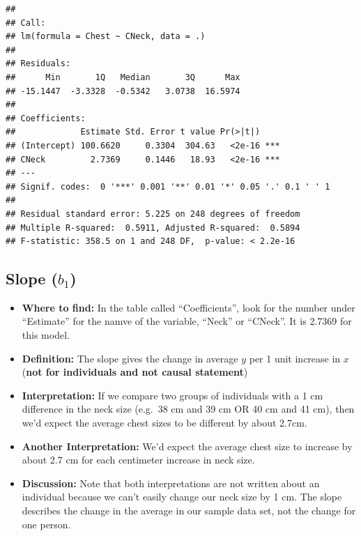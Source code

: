 \documentclass[]{book}
\newenvironment{Shaded}{\begin{snugshade}}{\end{snugshade}}
\newcommand{\DataTypeTok}[1]{\textcolor[rgb]{0.13,0.29,0.53}{#1}}
\newcommand{\KeywordTok}[1]{\textcolor[rgb]{0.13,0.29,0.53}{\textbf{#1}}}
\newcommand{\NormalTok}[1]{#1}
\newcommand{\OperatorTok}[1]{\textcolor[rgb]{0.81,0.36,0.00}{\textbf{#1}}}
\newcommand{\StringTok}[1]{\textcolor[rgb]{0.31,0.60,0.02}{#1}}
\providecommand{\tightlist}{%
  \setlength{\itemsep}{0pt}\setlength{\parskip}{0pt}}
\begin{document}
\begin{Shaded}
\end{Shaded}

\begin{verbatim}
## 
## Call:
## lm(formula = Chest ~ CNeck, data = .)
## 
## Residuals:
##      Min       1Q   Median       3Q      Max 
## -15.1447  -3.3328  -0.5342   3.0738  16.5974 
## 
## Coefficients:
##             Estimate Std. Error t value Pr(>|t|)    
## (Intercept) 100.6620     0.3304  304.63   <2e-16 ***
## CNeck         2.7369     0.1446   18.93   <2e-16 ***
## ---
## Signif. codes:  0 '***' 0.001 '**' 0.01 '*' 0.05 '.' 0.1 ' ' 1
## 
## Residual standard error: 5.225 on 248 degrees of freedom
## Multiple R-squared:  0.5911, Adjusted R-squared:  0.5894 
## F-statistic: 358.5 on 1 and 248 DF,  p-value: < 2.2e-16
\end{verbatim}

\hypertarget{slope-b_1}{%
\subsection{\texorpdfstring{Slope (\(b_1\))}{Slope (b\_1)}}\label{slope-b_1}}

\begin{itemize}
\tightlist
\item
  \textbf{Where to find:} In the table called ``Coefficients'', look for the number under ``Estimate'' for the namve of the variable, ``Neck'' or ``CNeck''. It is 2.7369 for this model.
\item
  \textbf{Definition:} The slope gives the change in average \(y\) per 1 unit increase in \(x\) (\textbf{not for individuals and not causal statement})
\item
  \textbf{Interpretation:} If we compare two groups of individuals with a 1 cm difference in the neck size (e.g.~38 cm and 39 cm OR 40 cm and 41 cm), then we'd expect the average chest sizes to be different by about 2.7cm.
\item
  \textbf{Another Interpretation:} We'd expect the average chest size to increase by about 2.7 cm for each centimeter increase in neck size.
\item
  \textbf{Discussion:} Note that both interpretations are not written about an individual because we can't easily change our neck size by 1 cm. The slope describes the change in the average in our sample data set, not the change for one person.
\end{itemize}
\end{document}
